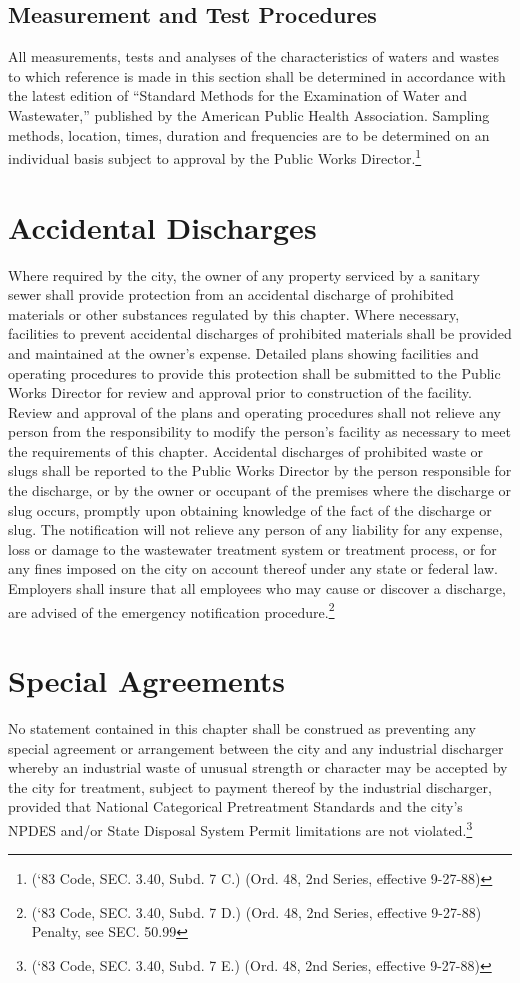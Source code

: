 \subsection{Measurement and Test Procedures}
All measurements, tests and analyses of the characteristics of waters and wastes to which reference is made in this section shall be determined in accordance with the latest edition of “Standard Methods for the Examination of Water and Wastewater,” published by the American Public Health Association.  Sampling methods, location, times, duration and frequencies are to be determined on an individual basis subject to approval by the Public Works Director.\footnote{(‘83 Code, SEC. 3.40, Subd. 7 C.) (Ord. 48, 2nd Series, effective 9-27-88)}

\section{Accidental Discharges}
Where required by the city, the owner of any property serviced by a sanitary sewer shall provide protection from an accidental discharge of prohibited materials or other substances regulated by this chapter.  Where necessary, facilities to prevent accidental discharges of prohibited materials shall be provided and maintained at the owner’s expense.  Detailed plans showing facilities and operating procedures to provide this protection shall be submitted to the Public Works Director for review and approval prior to construction of the facility.  Review and approval of the plans and operating procedures shall not relieve any person from the responsibility to modify the person’s facility as necessary to meet the requirements of this chapter.  Accidental discharges of prohibited waste or slugs shall be reported to the Public Works Director by the person responsible for the discharge, or by the owner or occupant of the premises where the discharge or slug occurs, promptly upon obtaining knowledge of the fact of the discharge or slug.  The notification will not relieve any person of any liability for any expense, loss or damage to the wastewater treatment system or treatment process, or for any fines imposed on the city on account thereof under any state or federal law.  Employers shall insure that all employees who may cause or discover a discharge, are advised of the emergency notification procedure.\footnote{(‘83 Code, SEC. 3.40, Subd. 7 D.) (Ord. 48, 2nd Series, effective 9-27-88) Penalty, see SEC. 50.99}

\section{Special Agreements}
No statement contained in this chapter shall be construed as preventing any special agreement or arrangement between the city and any industrial discharger whereby an industrial waste of unusual strength or character may be accepted by the city for treatment, subject to payment thereof by the industrial discharger, provided that National Categorical Pretreatment Standards and the city’s NPDES and/or State Disposal System Permit limitations are not violated.\footnote{(‘83 Code, SEC. 3.40, Subd. 7 E.) (Ord. 48, 2nd Series, effective 9-27-88)}

